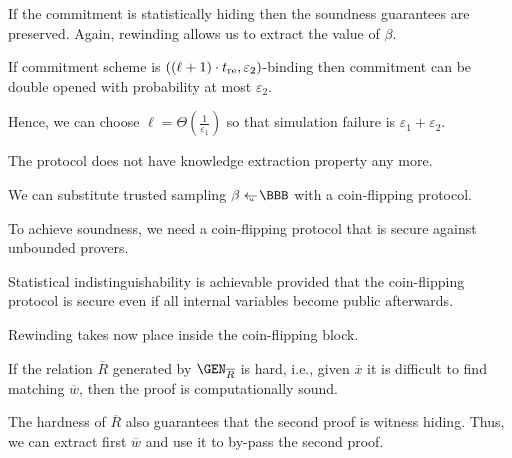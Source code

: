 \documentclass[landscape,footrule]{foils}
\begin{document}



If the commitment is statistically hiding then the soundness
guarantees are preserved. Again, rewinding allows us to extract the
value of $\beta$.
\begin{triangles}
\item If commitment scheme is
  $((\ell+1)\cdot t_{\mathrm{re}},\varepsilon_2)$-binding then commitment can be
  double opened with probability at most $\varepsilon_2$.
\item Hence, we can choose $\ell=\Theta(\frac{1}{\varepsilon_1})$ so
  that simulation failure is $\varepsilon_1+\varepsilon_2$.
\item The protocol does not have knowledge extraction property any more.
\end{triangles}



We can substitute trusted sampling $\beta\getsu\BBB$ with a
coin-flipping protocol.

\begin{triangles}
\item To achieve soundness, we need a coin-flipping protocol that is
  secure against unbounded provers.
\item Statistical indistinguishability is achievable provided that the
  coin-flipping protocol is secure even if all internal variables
  become public afterwards.
\item Rewinding takes now place inside the coin-flipping block.
\end{triangles}



If the relation $\overline{R}$ generated by $\GEN_{\overline{R}}$ is
hard, i.e., given $\overline{x}$ it is difficult to find matching
$\overline{w}$, then the proof is computationally sound.

The hardness of $\overline{R}$ also guarantees that the second proof
is witness hiding. Thus, we can extract first $\overline{w}$ and use
it to by-pass the second proof.
\end{document}
